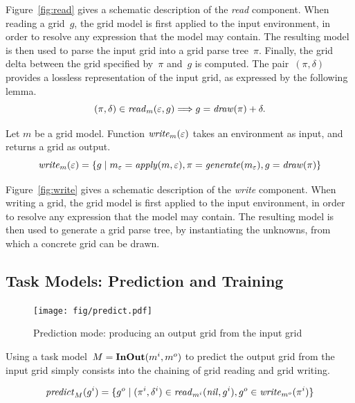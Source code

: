 \documentclass[a4paper]{llncs}
\begin{document}
Figure~\ref{fig:read} gives a schematic description of the {\em read}
component. When reading a grid~$g$, the grid model is first applied to
the input environment, in order to resolve any expression that the
model may contain. The resulting model is then used to parse the input
grid into a grid parse tree~$\pi$. Finally, the grid delta between the
grid specified by~$\pi$ and~$g$ is computed. The pair~$(\pi,\delta)$
provides a lossless representation of the input grid, as expressed by
the following lemma.
\[ (\pi,\delta) \in {\it read}_m(\varepsilon,g) \Longrightarrow g =
  {\it draw}(\pi) + \delta. \] %


\begin{definition}
  Let $m$ be a grid model. Function ${\it write}_m(\varepsilon)$ takes
  an environment as input, and returns a grid as output.
  \[ {\it write}_m(\varepsilon) = \{ g \mid m_\varepsilon = {\it
      apply}(m,\varepsilon), \pi = {\it generate}(m_\varepsilon), g =
    {\it draw}(\pi) \} \]
\end{definition}

Figure~\ref{fig:write} gives a schematic description of the {\em
  write} component. When writing a grid, the grid model is first
applied to the input environment, in order to resolve any expression
that the model may contain. The resulting model is then used to
generate a grid parse tree, by instantiating the unknowns, from which
a concrete grid can be drawn.


\subsection{Task Models: Prediction and Training}
\label{training:predicting}


\begin{figure}[t]
  \centering
  \texttt{[image: fig/predict.pdf]}
  \caption{Prediction mode: producing an output grid from the input grid}
  \label{fig:predict}
\end{figure}

Using a task model~$M = {\bf InOut}(m^i,m^o)$ to predict the output
grid from the input grid simply consists into the chaining of grid reading and grid writing.


\[ {\it predict}_M(g^i) = \{g^o \mid (\pi^i,\delta^i) \in {\it read}_{m^i}({\it nil},g^i), g^o \in {\it write}_{m^o}(\pi^i) \} \]
\end{document}
